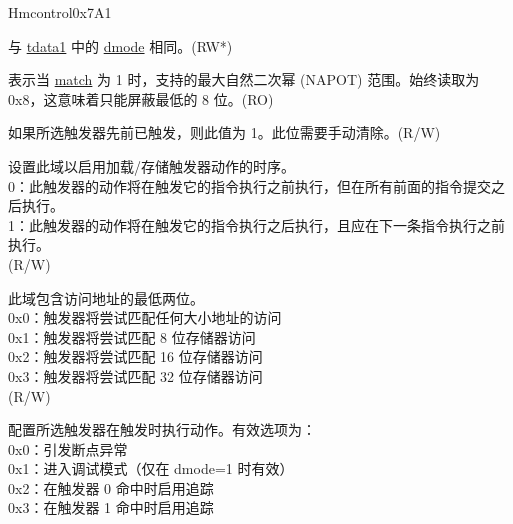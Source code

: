 \begin{register}{H}{mcontrol}{0x7A1}\label{regdesc:MCONTROL}
%
%
%
%
%
%
%
%
%
%
%
%
%
%
%
%
\regnewline%
\begin{regdesc}\begin{reglist}
\label{fielddesc:MCONTROLDMODE}\item [dmode] 与 \hyperref[regdesc:TDATA1]{tdata1} 中的 \hyperref[fielddesc:TDATA1DMODE]{dmode} 相同。(RW*)
\label{fielddesc:MCONTROLMASKMAX}\item [maskmax]
表示当 \hyperref[fielddesc:MCONTROLMATCH]{match} 为 1 时，支持的最大自然二次幂 (NAPOT) 范围。始终读取为 0x8，这意味着只能屏蔽最低的 8 位。(RO)
\label{fielddesc:MCONTROLHIT}\item [hit] 如果所选触发器先前已触发，则此值为 1。此位需要手动清除。(R/W)
\label{fielddesc:MCONTROLTIMING}\item [timing] 设置此域以启用加载/存储触发器动作的时序。\\
0：此触发器的动作将在触发它的指令执行之前执行，但在所有前面的指令提交之后执行。\\
1：此触发器的动作将在触发它的指令执行之后执行，且应在下一条指令执行之前执行。\\
(R/W)
\label{fielddesc:MCONTROLSIZELO}\item [sizelo] 此域包含访问地址的最低两位。\\
0x0：触发器将尝试匹配任何大小地址的访问\\
0x1：触发器将尝试匹配 8 位存储器访问\\
0x2：触发器将尝试匹配 16 位存储器访问\\
0x3：触发器将尝试匹配 32 位存储器访问\\
(R/W)
\label{fielddesc:MCONTROLACTION}\item [action] 配置所选触发器在触发时执行动作。有效选项为：\\
0x0：引发断点异常\\
0x1：进入调试模式（仅在 dmode=1 时有效）\\
0x2：在触发器 0 命中时启用追踪\\
0x3：在触发器 1 命中时启用追踪\\

\end{reglist}
\end{regdesc}
\end{register}
